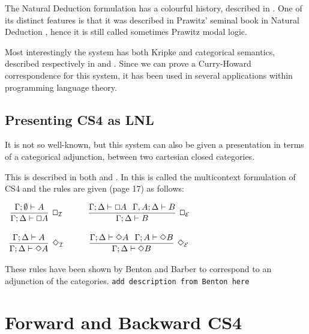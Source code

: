 \documentclass{article}
\renewcommand{\Box}{\oblong}
\begin{document}
The Natural Deduction formulation has a  colourful history, described in \cite{CS4}. One of its distinct features is that it was described in Prawitz' seminal book in Natural Deduction \cite{prawitz1965}, hence it is still called sometimes Prawitz modal logic.

Most interestingly the system has both Kripke and categorical semantics, described  respectively in \cite{alechinaetal} and \cite{CS4}. Since we can prove a Curry-Howard correspondence for this system, it has been used in several applications within programming language theory. 

\subsection{Presenting CS4 as LNL}
It is not so well-known, but this system can also be given a presentation in terms of a categorical adjunction, between two cartesian closed categories. 

This is described in both \cite{CS4} and \cite{icalp1998}. In \cite{CS4} this is called the multicontext formulation of CS4 and the rules are given (page 17) as follows:

\begin{center}
  \begin{math}
    \begin{array}{ccccc}              
      \infer[\Box_{\mathcal{I}}]{\Gamma; \Delta \vdash \Box A}{
        \Gamma;\emptyset \vdash  A
      }
      & \quad &
      \infer[\Box_{\mathcal{E}}]{\Gamma;\Delta \vdash B}{\Gamma; \Delta \vdash \Box A \hspace{.1in}
        \Gamma, A;\Delta \vdash B
      }\\\\
      \infer[\Diamond_{\mathcal{I}}]{\Gamma;\Delta \vdash \Diamond A}{
        \Gamma;\Delta \vdash A
      }
      & \quad &
      \infer[\Diamond_{\mathcal{E}}]{\Gamma;\Delta \vdash \Diamond B}{
        \Gamma ;\Delta \vdash \Diamond A \hspace{.1in}\Gamma; A\vdash \Diamond B
      }
    \end{array}        
  \end{math}
\end{center}

These rules have been shown by Benton\cite{benton1995} and Barber to correspond to an adjunction of the categories.
{\tt add description from Benton here}

\section{Forward and Backward CS4}
\end{document}
